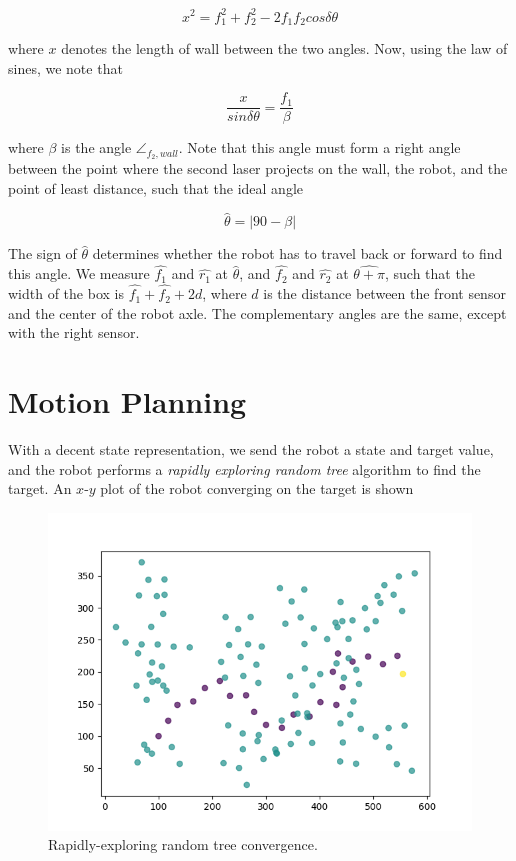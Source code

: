\documentclass[11pt]{article}
\begin{document}
\begin{equation}
x^2 = f_1^2 + f_2^2 - 2 f_1 f_2 cos\delta\theta
\end{equation}

where $x$ denotes the length of wall between the two angles. Now, using the law of sines, we note that

\begin{equation}
\frac{x}{sin\delta\theta} = \frac{f_1}{\beta}
\end{equation}

where $\beta$ is the angle $\angle_{f_2, wall}$. Note that this angle must form a right angle between the point where the second laser projects on the wall, the robot, and the point of least distance, such that the ideal angle

\begin{equation}
\hat{\theta} = |90 - \beta|
\end{equation}

The sign of $\hat{\theta}$ determines whether the robot has to travel back or forward to find this angle. We measure $\hat{f_1}$ and $\hat{r_1}$ at $\hat{\theta}$, and $\hat{f_2}$ and $\hat{r_2}$ at $\hat{\theta + \pi}$, such that the width of the box is $\hat{f_1} + \hat{f_2} + 2d$, where $d$ is the distance between the front sensor and the center of the robot axle. The complementary angles are the same, except with the right sensor.

\section{Motion Planning}

With a decent state representation, we send the robot a state and target value, and the robot performs a \emph{rapidly exploring random tree} algorithm to find the target. An $x$-$y$ plot of the robot converging on the target is shown

\begin{figure}[H]
	\includegraphics[width=\linewidth]{fig2.png}
	\caption{Rapidly-exploring random tree convergence.}
	\label{fig:rrt}
\end{figure}
\end{document}
